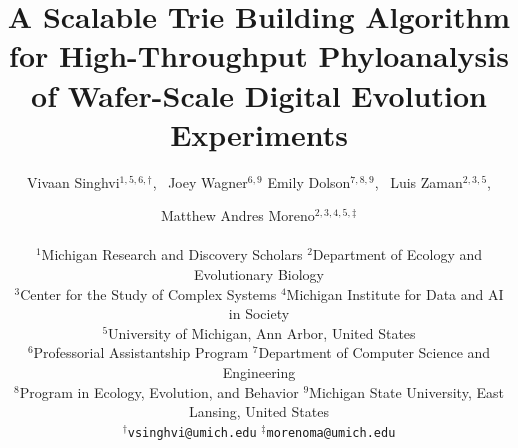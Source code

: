 \title{A Scalable Trie Building Algorithm for High-Throughput Phyloanalysis of Wafer-Scale Digital Evolution Experiments}

\author{
    Vivaan Singhvi$^{1,5,6,\dagger}$,\ %
    Joey Wagner$^{6,9}$
    Emily Dolson$^{7,8,9}$,\ %
    Luis Zaman$^{2,3,5}$, \and
    Matthew Andres Moreno$^{2,3,4,5,\ddagger}$ \\
    \mbox{}\\
    $^1$Michigan Research and Discovery Scholars
    $^2$Department of Ecology and Evolutionary Biology \\
    $^3$Center for the Study of Complex Systems
    $^4$Michigan Institute for Data and AI in Society \\
    $^5$University of Michigan, Ann Arbor, United States \\
    $^6$Professorial Assistantship Program
    $^7$Department of Computer Science and Engineering \\
    $^8$Program in Ecology, Evolution, and Behavior
    $^9$Michigan State University, East Lansing, United States \\
    $^\dagger$\texttt{vsinghvi@umich.edu} $^\ddagger$\texttt{morenoma@umich.edu}
}

\maketitle


\maketitle
